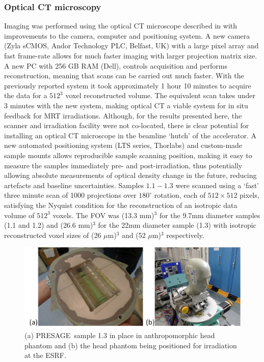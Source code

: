 	\subsubsection{Optical CT microscopy}
	Imaging was performed using the optical CT microscope described in \cite{doranestablishing2013} with improvements to the camera, computer and positioning system. A new camera (Zyla sCMOS, Andor Technology PLC, Belfast, UK) with a large pixel array and fast frame-rate allows for much faster imaging with larger projection matrix size. A new PC with 256 GB RAM (Dell), controls acquisition and performs reconstruction, meaning that scans can be carried out much faster. With the previously reported system it took approximately 1 hour 10 minutes to acquire the data for a $512^3$ voxel reconstructed volume. The equivalent scan takes under 3 minutes with the new system, making optical CT a viable system for in situ feedback for MRT irradiations. Although, for the results presented here, the scanner and irradiation facility were not co-located, there is clear potential for installing an optical CT microscope in the beamline `hutch' of the accelerator. A new automated positioning system (LTS series, Thorlabs) and custom-made sample mounts allows reproducible sample scanning position, making it easy to measure the samples immediately pre- and post-irradiation, thus potentially allowing absolute measurements of optical density change in the future, reducing artefacts and baseline uncertainties. 
	Samples $1.1−1.3$ were scanned using a `fast' three minute scan of 1000 projections over $180^{\circ}$ rotation, each of $512 \times 512$ pixels, satisfying the Nyquist condition for the reconstruction of an isotropic data volume of $512^3$ voxels. The FOV was (13.3 mm)$^3$ for the 9.7mm diameter samples (1.1 and 1.2) and (26.6 mm)$^3$ for the 22mm diameter sample (1.3) with isotropic reconstructed voxel sizes of (26 $\mu$m)$^3$ and (52 $\mu$m)$^3$ respectively.
	
	\begin{figure}
		\centering
		\includegraphics[width=0.9\linewidth]{mrt_img/mrt_Fig1}
		\caption{(a) PRESAGE\textregistered \ sample 1.3 in place in anthropomorphic head phantom and (b) the head phantom being positioned for irradiation at the ESRF.}
		\label{fig:Fig1christopher}
	\end{figure}
	
